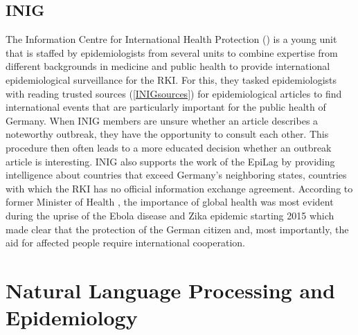 \subsection{INIG}
The Information Centre for International Health Protection () is a young unit that is staffed by epidemiologists from several units to combine expertise from different backgrounds in medicine and public health to provide international epidemiological surveillance for the RKI.
For this, they tasked epidemiologists with reading trusted sources (\ref{INIGsources}) for epidemiological articles to find international events that are particularly important for the public health of Germany.
When INIG members are unsure whether an article describes a noteworthy outbreak, they have the opportunity to consult each other.
This procedure then often leads to a more educated decision whether an outbreak article is interesting.
INIG also supports the work of the EpiLag by providing intelligence about countries that exceed Germany's neighboring states, countries with which the RKI has no official information exchange agreement.
According to former Minister of Health \citeauthor{Grohe2017}, the importance of global health was most evident during the uprise of the Ebola disease and Zika epidemic starting 2015 which made clear that the protection of the German citizen and, most importantly, the aid for affected people require international cooperation.


\section{Natural Language Processing and Epidemiology}

